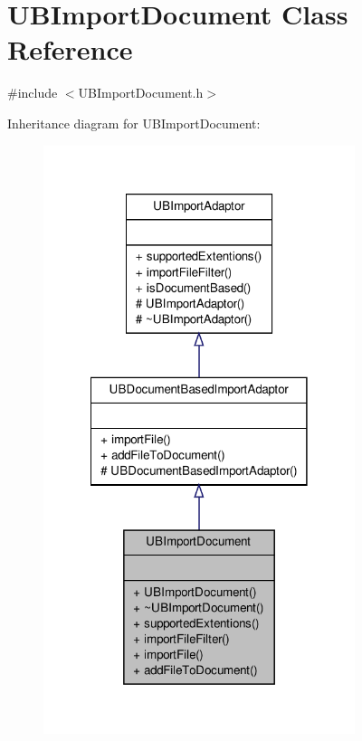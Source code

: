 \hypertarget{class_u_b_import_document}{\section{U\-B\-Import\-Document Class Reference}
\label{d9/df2/class_u_b_import_document}
}


{\ttfamily \#include $<$U\-B\-Import\-Document.\-h$>$}



Inheritance diagram for U\-B\-Import\-Document\-:
\nopagebreak
\begin{figure}[H]
\begin{center}
\leavevmode
\includegraphics[width=258pt]{dd/da0/class_u_b_import_document__inherit__graph}
\end{center}
\end{figure}


